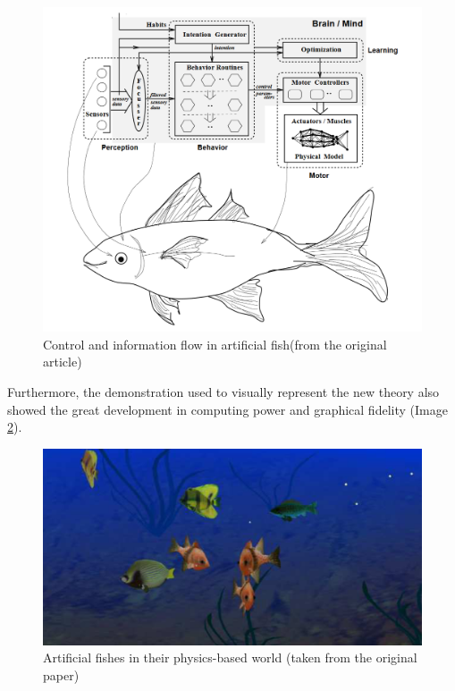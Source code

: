 \documentclass[sigconf]{acmart}
\begin{document}
\begin{figure}[h]
  \centering
  \includegraphics[width=\linewidth]{images/fish_learning.png}
  \caption{Control and information flow in artificial fish(from the original article\cite{Terzopoulos94artificialfishes:})}
  \label{fig:fishControlFlow}
\end{figure}

Furthermore, the demonstration used
to visually represent the new theory also showed the great development in computing
power and graphical fidelity (Image \ref{fig:smartFish}).

\begin{figure}[h]
  \centering
  \includegraphics[width=\linewidth]{images/smart_fish.png}
  \caption{Artificial fishes in their physics-based world (taken from the original paper\cite{Terzopoulos94artificialfishes:})}
  \label{fig:smartFish}
\end{figure}
\end{document}
